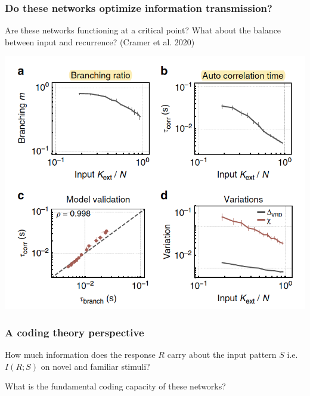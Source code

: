 \documentclass{beamer}
\begin{document}
\begin{frame}[plain]
\frametitle{Do these networks optimize information transmission?} 

Are these networks functioning at a critical point? What about the balance between input and recurrence? (Cramer et al. 2020)

\begin{center}
\includegraphics[scale=0.55]{cramer-criticality}
\end{center}

\end{frame}




\begin{frame}[plain]
\frametitle{A coding theory perspective} 

How much information does the response $R$ carry about the input pattern $S$ i.e. $I(R;S)$ on novel and familiar stimuli?

\vspace{0.2in}

What is the fundamental coding capacity of these networks?

\end{frame}


\begin{thebibliography}{99} 
\end{thebibliography}
\end{document}
